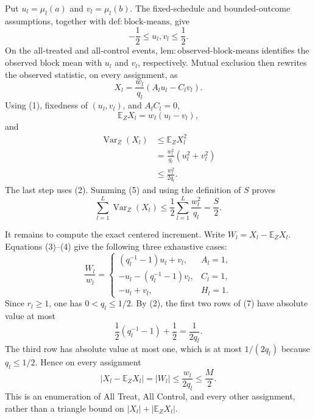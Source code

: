 Put \(u_l=\mu_l(a)\) and \(v_l=\mu_l(b)\). The fixed-schedule and bounded-outcome assumptions, together with \(\mathrm{def{:}block\text{-}means}\), give
\[
 -\frac12\le u_l,v_l\le\frac12.
\tag{2}
\]
On the all-treated and all-control events, \(\mathrm{lem{:}observed\text{-}block\text{-}means}\) identifies the observed block mean with \(u_l\) and \(v_l\), respectively. Mutual exclusion then rewrites the observed statistic, on every assignment, as
\[
 X_l=\frac{w_l}{q_l}(A_lu_l-C_lv_l).
\tag{3}
\]
Using (1), fixedness of \((u_l,v_l)\), and \(A_lC_l=0\),
\[
 \mathbb E_ZX_l=w_l(u_l-v_l),
\tag{4}
\]
and
\[
\begin{aligned}
 \operatorname{Var}_Z(X_l)
 &\le\mathbb E_ZX_l^2\\
 &=\frac{w_l^2}{q_l}(u_l^2+v_l^2)\\
 &\le\frac{w_l^2}{2q_l}.
\end{aligned}
\tag{5}
\]
The last step uses (2). Summing (5) and using the definition of \(S\) proves
\[
 \sum_{l=1}^L\operatorname{Var}_Z(X_l)
 \le\frac12\sum_{l=1}^L\frac{w_l^2}{q_l}=\frac S2.
\tag{6}
\]

It remains to compute the exact centered increment. Write \(W_l=X_l-\mathbb E_ZX_l\). Equations (3)--(4) give the following three exhaustive cases:
\[
 \frac{W_l}{w_l}=
 \begin{cases}
  (q_l^{-1}-1)u_l+v_l,&A_l=1,\\
  -u_l-(q_l^{-1}-1)v_l,&C_l=1,\\
  -u_l+v_l,&H_l=1.
 \end{cases}
\tag{7}
\]
Since \(r_l\ge1\), one has \(0<q_l\le1/2\). By (2), the first two rows of (7) have absolute value at most
\[
 \frac12(q_l^{-1}-1)+\frac12=\frac1{2q_l}.
\tag{8}
\]
The third row has absolute value at most one, which is at most \(1/(2q_l)\) because \(q_l\le1/2\). Hence on every assignment
\[
 |X_l-\mathbb E_ZX_l|=|W_l|
 \le\frac{w_l}{2q_l}\le\frac M2.
\tag{9}
\]
This is an enumeration of All Treat, All Control, and every other assignment, rather than a triangle bound on \(|X_l|+|\mathbb E_ZX_l|\).

